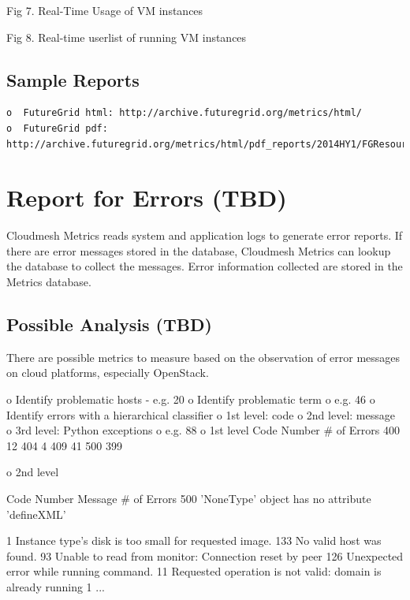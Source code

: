 \documentclass{sig-alternate-05-2015}
\begin{document}
 
Fig 7. Real-Time Usage of VM instances


 
Fig 8. Real-time userlist of running VM instances

\subsection{Sample Reports}

\begin{verbatim}
o  FutureGrid html: http://archive.futuregrid.org/metrics/html/
o  FutureGrid pdf: http://archive.futuregrid.org/metrics/html/pdf_reports/2014HY1/FGResourceReport.pdf
\end{verbatim}

\section{Report for Errors (TBD)}

Cloudmesh Metrics reads system and application logs to generate error reports. If there are error messages stored in the database, Cloudmesh Metrics can lookup the database to collect the messages. Error information collected are stored in the Metrics database.

\subsection{Possible Analysis (TBD)}

There are possible metrics to measure based on the observation of error messages on cloud platforms, especially OpenStack.

o  Identify problematic hosts
- e.g. 20%
o  Identify problematic term
o       e.g. 46%
o  Identify errors with a hierarchical classifier
o       1st level: code
o       2nd level: message
o       3rd level: Python exceptions
o       e.g. 88%
o       1st level
Code Number     \# of Errors
400     12
404     4
409     41
500     399

o       2nd level


Code Number     Message \# of Errors
500     'NoneType' object has no attribute 'defineXML'  

        1
        Instance type's disk is too small for requested image.          133
        No valid host was found.        93
        Unable to read from monitor: Connection reset by peer   126
        Unexpected error while running command. 11
        Requested operation is not valid: domain is already running     1
        ...     
\end{document}
